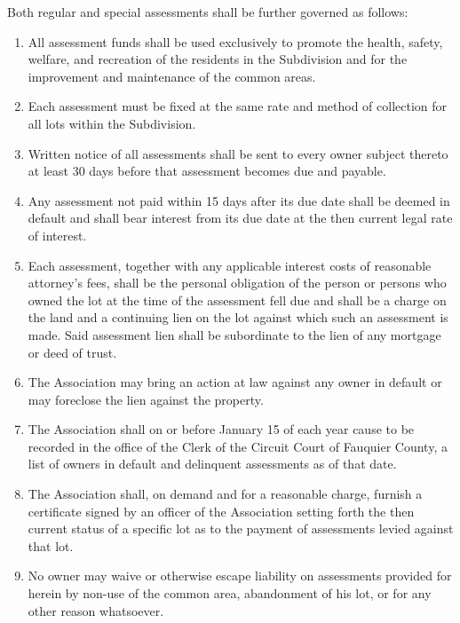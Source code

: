 \documentclass[10pt, letterpaper]{article}
\begin{document}
\begin{enumerate}
    Both regular and special assessments shall be further governed as follows:
    \begin{enumerate}
      \item All assessment funds shall be used exclusively to promote the health, safety, welfare, and recreation of the residents in the Subdivision and for the improvement and maintenance of the common areas.
      \item Each assessment must be fixed at the same rate and method of collection for all lots within the Subdivision.
      \item Written notice of all assessments shall be sent to every owner subject thereto at least 30 days before that assessment becomes due and payable.
      \item Any assessment not paid within 15 days after its due date shall be deemed in default and shall bear interest from its due date at the then current legal rate of interest.
      \item Each assessment, together with any applicable interest costs of reasonable attorney's fees, shall be the personal obligation of the person or persons who owned the lot at the time of the assessment fell due and shall be a charge on the land and a continuing lien on the lot against which such an assessment is made.
        Said assessment lien shall be subordinate to the lien of any mortgage or deed of trust.
      \item The Association may bring an action at law against any owner in default or may foreclose the lien against the property.
      \item The Association shall on or before January 15 of each year cause to be recorded in the office of the Clerk of the Circuit Court of Fauquier County, a list of owners in default and delinquent assessments as of that date.
      \item The Association shall, on demand and for a reasonable charge, furnish a certificate signed by an officer of the Association setting forth the then current status of a specific lot as to the payment of assessments levied against that lot.
      \item No owner may waive or otherwise escape liability on assessments provided for herein by non-use of the common area, abandonment of his lot, or for any other reason whatsoever.
    \end{enumerate}
\end{enumerate}
\end{document}
